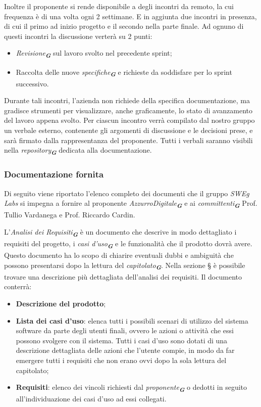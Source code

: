 Inoltre il proponente si rende disponibile a degli incontri da remoto, la cui frequenza è di una volta ogni 2 settimane.
E in aggiunta due incontri in presenza, di cui il primo ad inizio progetto e il secondo nella parte finale.
Ad ognuno di questi incontri la discussione verterà su 2 punti:
\begin{itemize}
    \item \emph{Revisione}\textsubscript{\textit{\textbf{G}}} sul lavoro svolto nel precedente sprint;
    \item Raccolta delle nuove \emph{specifiche}\textsubscript{\textit{\textbf{G}}} e richieste da soddisfare per lo sprint successivo.
\end{itemize}
Durante tali incontri, l’azienda non richiede della specifica documentazione, ma gradisce strumenti per visualizzare, anche graficamente, lo stato di avanzamento del lavoro appena svolto.
Per ciascun incontro verrà compilato dal nostro gruppo un verbale esterno, contenente gli argomenti di discussione e le decisioni prese, e sarà firmato dalla rappresentanza del proponente.
Tutti i verbali saranno visibili nella \emph{repository}\textsubscript{\textit{\textbf{G}}} dedicata alla documentazione.

\subsubsection{Documentazione fornita}
\label{sec:documentazione_fornita}
Di seguito viene riportato l'elenco completo dei documenti che il gruppo \emph{SWEg Labs} si impegna a fornire al proponente \emph{AzzurroDigitale}\textsubscript{\textit{\textbf{G}}}
e ai \emph{committenti}\textsubscript{\textit{\textbf{G}}} Prof. Tullio Vardanega e Prof. Riccardo Cardin.

L'\emph{Analisi dei Requisiti}\textsubscript{\textit{\textbf{G}}} è un documento che descrive in modo dettagliato i requisiti del progetto, i \emph{casi d'uso}\textsubscript{\textit{\textbf{G}}} e le funzionalità che il prodotto dovrà avere. 
Questo documento ha lo scopo di chiarire eventuali dubbi e ambiguità che possono presentarsi dopo la lettura del \emph{capitolato}\textsubscript{\textit{\textbf{G}}}.
Nella sezione \S{} è possibile trovare una descrizione più dettagliata dell'analisi dei requisiti.
Il documento conterrà:
\begin{itemize}
    \item \textbf{Descrizione del prodotto};
    \item \textbf{Lista dei casi d'uso}: elenca tutti i possibili scenari di utilizzo del sistema software
    da parte degli utenti finali, ovvero le azioni o attività che essi possono svolgere con il
    sistema. Tutti i casi d’uso sono dotati di una descrizione dettagliata delle azioni che
    l’utente compie, in modo da far emergere tutti i requisiti che non erano ovvi dopo la
    sola lettura del capitolato;
    \item \textbf{Requisiti}: elenco dei vincoli richiesti dal \emph{proponente}\textsubscript{\textit{\textbf{G}}} o dedotti in seguito all'individuazione dei casi d'uso ad essi collegati.
\end{itemize}

